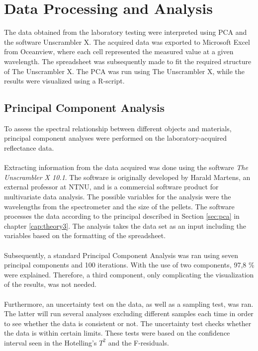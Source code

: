 \section{Data Processing and Analysis}
The data obtained from the laboratory testing were interpreted using PCA and the software Unscrambler X. The acquired data was exported to Microsoft Excel from Oceanview, where each cell represented the measured value at a given wavelength. The spreadsheet was subsequently made to fit the required structure of The Unscrambler X. The PCA was run using The Unscrambler X, while the results were visualized using a R-script.

\subsection{Principal Component Analysis}
To assess the spectral relationship between different objects and materials, principal component analyses were performed on the laboratory-acquired reflectance data. 
\\\\
Extracting information from the data acquired was done using the software \textit{The Unscrambler X 10.1}. The software is originally developed by Harald Martens, an external professor at NTNU, and is a commercial software product for multivariate data analysis. The possible variables for the analysis were the wavelengths from the spectrometer and the size of the pellets. The software processes the data according to the principal described in Section \ref{sec:pca} in chapter \ref{cap:theory3}. The analysis takes the data set as an input including the variables based on the formatting of the spreadsheet. 
\\\\
Subsequently, a standard Principal Component Analysis was ran using seven principal components and 100 iterations. With the use of two components, 97,8 \% were explained. Therefore, a third component, only complicating the visualization of the results, was not needed.
\\\\
Furthermore, an uncertainty test on the data, as well as a sampling test, was ran. The latter will run several analyses excluding different samples each time in order to see whether the data is consistent or not. The uncertainty test checks whether the data is within certain limits. These tests were based on the confidence interval seen in the Hotelling's $T^2$ and the F-residuals. 
